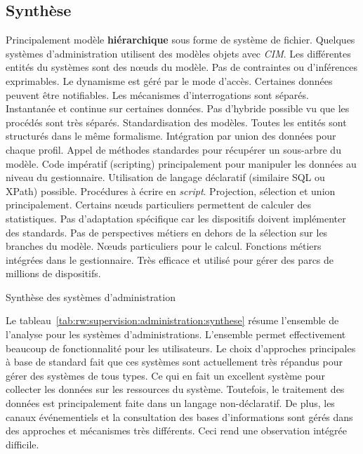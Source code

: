 \subsection{Synthèse}

\begin{table}[!ht]
\criteretabDonnee
    {Principalement modèle \textbf{hiérarchique} sous forme de système de fichier. Quelques systèmes d'administration utilisent des modèles objets avec \textit{CIM}.}
    {Les différentes entités du systèmes sont des nœuds du modèle. Pas de contraintes ou d'inférences exprimables.}
    {Le dynamisme est géré par le mode d'accès. Certaines données peuvent être notifiables. Les mécanismes d'interrogations sont séparés.}
\criteretabTraitement
    {Instantanée et continue sur certaines données. Pas d'hybride possible vu que les procédés sont très séparés.}
    {Standardisation des modèles. Toutes les entités sont structurés dans le même formalisme. Intégration par union des données pour chaque profil.}
    {Appel de méthodes standardes pour récupérer un sous-arbre du modèle. Code impératif (scripting) principalement pour manipuler les données au niveau du gestionnaire. Utilisation de langage déclaratif (similaire SQL ou XPath) possible.}
    {Procédures à écrire en \textit{script}. Projection, sélection et union principalement. Certains nœuds particuliers permettent de calculer des statistiques.}
\criteretabAdaptabilite
    {Pas d'adaptation spécifique car les dispositifs doivent implémenter des standards.}
    {Pas de perspectives métiers en dehors de la sélection sur les branches du modèle.}
    {Nœuds particuliers pour le calcul. Fonctions métiers intégrées dans le gestionnaire.}
    {Très efficace et utilisé pour gérer des parcs de millions de dispositifs.}
\caption{Synthèse des systèmes d'administration}\label{tab:rw:supervision:administration:synthese}
\end{table}

Le tableau~\ref{tab:rw:supervision:administration:synthese} résume l'ensemble de l'analyse pour les systèmes d'administrations. L'ensemble permet effectivement beaucoup de fonctionnalité pour les utilisateurs. Le choix d'approches principales à base de standard fait que ces systèmes sont actuellement très répandus pour gérer des systèmes de tous types. Ce qui en fait un excellent système pour collecter les données sur les ressources du système. Toutefois, le traitement des données est principalement faite dans un langage non-déclaratif. De plus, les canaux événementiels et la consultation des bases d'informations sont gérés dans des approches et mécanismes très différents. Ceci rend une observation intégrée difficile.